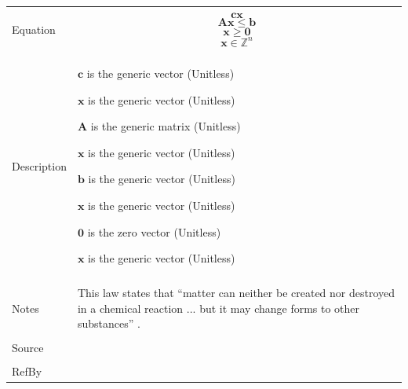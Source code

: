 \documentclass[12pt]{article}
\begin{document}
\begin{minipage}{\textwidth}
\begin{tabular}{>{\raggedright}p{}>{\raggedright\arraybackslash}p{}}
\\ \midrule \\
Equation & \begin{displaymath}
           \symbf{c} \symbf{x}
           \end{displaymath}
           \begin{displaymath}
           \symbf{A} \symbf{x}\leq{}\symbf{b}
           \end{displaymath}
           \begin{displaymath}
           \symbf{x}\geq{}\symbf{0}
           \end{displaymath}
           \begin{displaymath}
           \symbf{x}\in{}\mathbb{Z}^{n}
           \end{displaymath}
\\ \midrule \\
Description & \begin{symbDescription}
              \item{$\symbf{c}$ is the generic vector (Unitless)}
              \item{$\symbf{x}$ is the generic vector (Unitless)}
              \end{symbDescription}
              \begin{symbDescription}
              \item{$\symbf{A}$ is the generic matrix (Unitless)}
              \item{$\symbf{x}$ is the generic vector (Unitless)}
              \item{$\symbf{b}$ is the generic vector (Unitless)}
              \end{symbDescription}
              \begin{symbDescription}
              \item{$\symbf{x}$ is the generic vector (Unitless)}
              \item{$\symbf{0}$ is the zero vector (Unitless)}
              \end{symbDescription}
              \begin{symbDescription}
              \item{$\symbf{x}$ is the generic vector (Unitless)}
              \end{symbDescription}
\\ \midrule \\
Notes & This law states that ``matter can neither be created nor destroyed in a chemical reaction ... but it may change forms to other substances'' \cite[(pg. 112)]{lund2023}.
        
\\ \midrule \\
Source & \cite{lund2023}
         
\\ \midrule \\
RefBy & 
\\ \bottomrule
\end{tabular}
\end{minipage}
\end{document}
